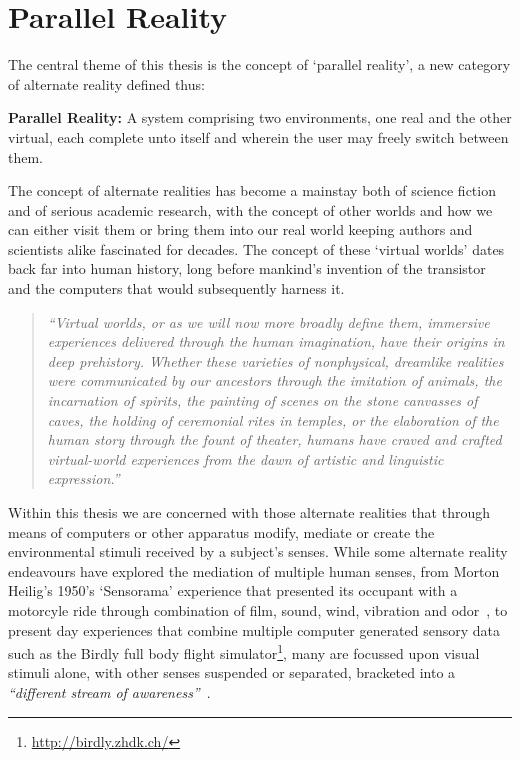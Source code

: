 
\section{Parallel Reality}
\label{intro-parallel-reality}
The central theme of this thesis is the concept of `parallel reality', a new category of alternate reality defined thus:

\vspace{7mm}

\textbf{Parallel Reality:} A system comprising two environments, one real and the other virtual, each complete unto itself and wherein the user may freely switch between them.

\vspace{7mm}


The concept of alternate realities has become a mainstay both of science fiction and of serious academic research, with the concept of other worlds and how we can either visit them or bring them into our real world keeping authors and scientists alike fascinated for decades. The concept of these `virtual worlds' dates back far into human history, long before mankind's invention of the transistor and the computers that would subsequently harness it.

\begin{quote}
	\textit{``Virtual worlds, or as we will now more broadly define them, immersive experiences delivered through the human imagination, have their origins in deep prehistory. Whether these varieties of nonphysical, dreamlike realities were communicated by our ancestors through the imitation of animals, the incarnation of spirits, the painting of scenes on the stone canvasses of caves, the holding of ceremonial rites in temples, or the elaboration of the human story through the fount of theater, humans have craved and crafted virtual-world experiences from the dawn of artistic and linguistic expression.''}~\cite{Damer2014}
\end{quote}

Within this thesis we are concerned with those alternate realities that through means of computers or other apparatus modify, mediate or create the environmental stimuli received by a subject's senses. While some alternate reality endeavours have explored the mediation of multiple human senses, from Morton Heilig's 1950's `Sensorama' experience that presented its occupant with a motorcyle ride through combination of film, sound, wind, vibration and odor~\cite{Rheingold1992}, to present day experiences that combine multiple computer generated sensory data such as the Birdly full body flight simulator\footnote{\url{http://birdly.zhdk.ch/}}, many are focussed upon visual stimuli alone, with other senses suspended or separated, bracketed into a \textit{``different stream of awareness''}~\cite{Adams2014}.

